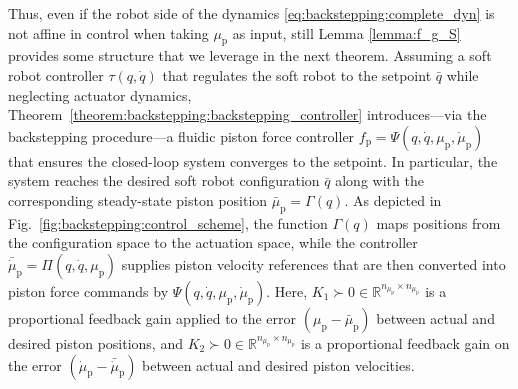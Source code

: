 Thus, even if the robot side of the dynamics \eqref{eq:backstepping:complete_dyn} is not affine in control when taking $\mu_\mathrm{p}$ as input, still Lemma \ref{lemma:f_g_S} provides some structure that we leverage in the next theorem.
%
Assuming a soft robot controller $\tau(q,\dot{q})$ that regulates the soft robot to the setpoint $\bar{q}$ while neglecting actuator dynamics, Theorem~\ref{theorem:backstepping:backstepping_controller} introduces—via the backstepping procedure—a fluidic piston force controller $f_\mathrm{p} = \Psi(q,\dot{q},\mu_\mathrm{p}, \dot{\mu}_\mathrm{p})$ that ensures the closed-loop system converges to the setpoint. In particular, the system reaches the desired soft robot configuration $\bar{q}$ along with the corresponding steady-state piston position $\bar{\mu}_\mathrm{p} = \Gamma(q)$. As depicted in Fig.~\ref{fig:backstepping:control_scheme}, the function $\Gamma(q)$ maps positions from the configuration space to the actuation space, while the controller $\bar{\dot{\mu}}_\mathrm{p} = \Pi(q,\dot{q},\mu_\mathrm{p})$ supplies piston velocity references that are then converted into piston force commands by $\Psi(q,\dot{q},\mu_\mathrm{p}, \dot{\mu}_\mathrm{p})$. Here, $K_1 \succ 0 \in \mathbb{R}^{n_{\mu_\mathrm{p}} \times n_{\mu_\mathrm{p}}}$ is a proportional feedback gain applied to the error $(\mu_\mathrm{p} - \bar{\mu}_\mathrm{p})$ between actual and desired piston positions, and $K_2 \succ 0 \in \mathbb{R}^{n_{\mu_\mathrm{p}} \times n_{\mu_\mathrm{p}}}$ is a proportional feedback gain on the error $(\dot{\mu}_\mathrm{p} - \bar{\dot{\mu}}_\mathrm{p})$ between actual and desired piston velocities.

